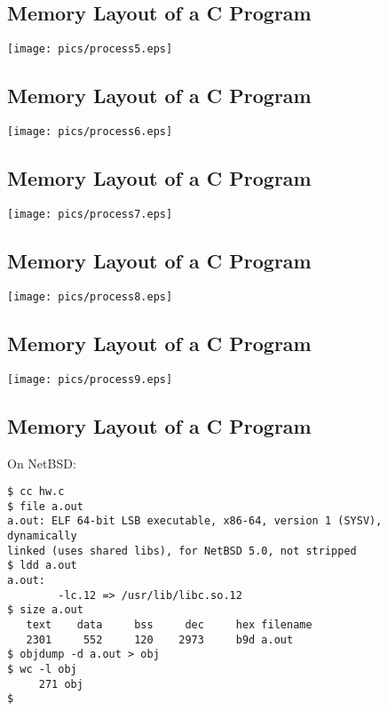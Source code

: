 \documentclass[xga]{xdvislides}
\begin{document}
\subsection{Memory Layout of a C Program}
\begin{center}
	\texttt{[image: pics/process5.eps]}
\end{center}

\subsection{Memory Layout of a C Program}
\begin{center}
	\texttt{[image: pics/process6.eps]}
\end{center}

\subsection{Memory Layout of a C Program}
\begin{center}
	\texttt{[image: pics/process7.eps]}
\end{center}

\subsection{Memory Layout of a C Program}
\begin{center}
	\texttt{[image: pics/process8.eps]}
\end{center}

\subsection{Memory Layout of a C Program}
\begin{center}
	\texttt{[image: pics/process9.eps]}
\end{center}

\subsection{Memory Layout of a C Program}
On NetBSD:
\begin{verbatim}
$ cc hw.c
$ file a.out
a.out: ELF 64-bit LSB executable, x86-64, version 1 (SYSV), dynamically
linked (uses shared libs), for NetBSD 5.0, not stripped
$ ldd a.out
a.out:
        -lc.12 => /usr/lib/libc.so.12
$ size a.out
   text    data     bss     dec     hex filename
   2301     552     120    2973     b9d a.out
$ objdump -d a.out > obj
$ wc -l obj
     271 obj
$
\end{verbatim}
\end{document}
